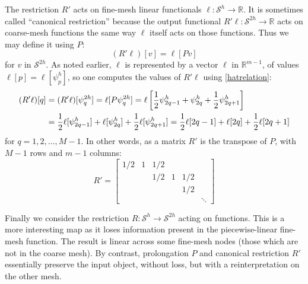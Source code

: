 \documentclass[letterpaper,final,12pt,reqno]{amsart}
\newcommand{\RR}{\mathbb{R}}
\begin{document}
The restriction $R'$ acts on fine-mesh linear functionals $\ell:\mathcal{S}^h \to \RR$.  It is sometimes called ``canonical restriction'' \cite{GraeserKornhuber2009} because the output functional $R'\ell:\mathcal{S}^{2h}\to \RR$ acts on coarse-mesh functions the same way $\ell$ itself acts on those functions.  Thus we may define it using $P$:
\begin{equation}
  (R'\ell)[v] = \ell[Pv]  \label{rprimedefinition}
\end{equation}
for $v$ in $\mathcal{S}^{2h}$.  As noted earlier, $\ell$ is represented by a vector $\bm{\ell}$ in $\RR^{m-1}$, of values $\ell[p] = \ell[\psi_p^h]$, so one computes the values of $R'\ell$ using \eqref{hatrelation}:
\begin{align}
  (R'\ell)[q] &= (R'\ell)[\psi_q^{2h}] = \ell[P\psi_q^{2h}] = \ell\left[\frac{1}{2} \psi_{2q-1}^h + \psi_{2q}^h + \frac{1}{2} \psi_{2q+1}^h\right]  \label{rprimeformula} \\
      &= \frac{1}{2} \ell[\psi_{2q-1}^h] + \ell[\psi_{2q}^h] + \frac{1}{2} \ell[\psi_{2q+1}^h] = \frac{1}{2} \ell[2q-1] + \ell[2q] + \frac{1}{2} \ell[2q+1]  \notag
\end{align}
for $q=1,2,\dots,M-1$.  In other words, as a matrix $R'$ is the transpose of $P$, with $M-1$ rows and $m-1$ columns:
\begin{equation}
R' = \begin{bmatrix}
1/2 & 1 & 1/2 &   &     & \\
    &   & 1/2 & 1 & 1/2 & \\
    &   &     &   & 1/2 & \\
    &   &     &   &     & \ddots
\end{bmatrix} \label{rprimematrix}
\end{equation}

Finally we consider the restriction $R:\mathcal{S}^h\to\mathcal{S}^{2h}$ acting on functions.  This is a more interesting map as it loses information present in the piecewise-linear fine-mesh function.  The result is linear across some fine-mesh nodes (those which are not in the coarse mesh).  By contrast, prolongation $P$ and canonical restriction $R'$ essentially preserve the input object, without loss, but with a reinterpretation on the other mesh.

\newcommand{\Rpr}{R_{\text{pr}}}
\newcommand{\Rin}{R_{\text{in}}}
\newcommand{\Rfw}{R_{\text{fw}}}
\end{document}
